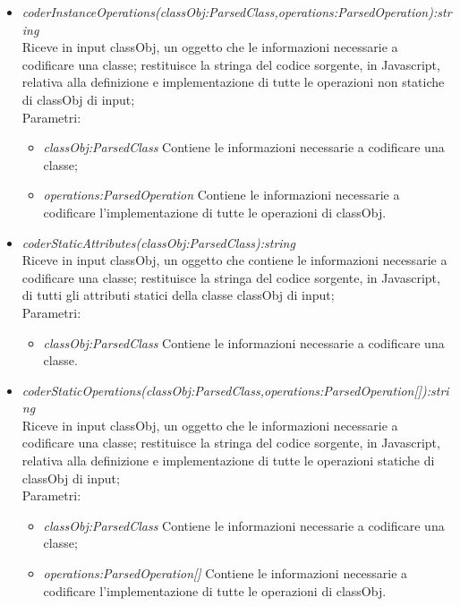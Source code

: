 \documentclass[../DefinizioneDiProdotto.tex]{subfiles}
\begin{document}
\begin{itemize}
\begin{itemize}
					\item \emph{coderInstanceOperations(classObj:ParsedClass,operations:ParsedOperation):string} \\ 
					Riceve in input classObj, un oggetto che le informazioni necessarie a codificare una classe; 
					restituisce la stringa del codice sorgente, in Javascript, relativa alla definizione e implementazione di tutte le operazioni non statiche di classObj di input; \\
					Parametri:
					\begin{itemize}
						\item \emph{classObj:ParsedClass} Contiene le informazioni necessarie a codificare una classe;
						\item \emph{operations:ParsedOperation} Contiene le informazioni necessarie a codificare l'implementazione di tutte le operazioni di classObj.
					\end{itemize}
					
					\item \emph{coderStaticAttributes(classObj:ParsedClass):string} \\ 
					Riceve in input classObj, un oggetto che contiene le informazioni necessarie a codificare una classe; 
					restituisce la stringa del codice sorgente, in Javascript, di tutti gli attributi statici della classe classObj di input; \\
					Parametri:
					\begin{itemize}
						\item \emph{classObj:ParsedClass} Contiene le informazioni necessarie a codificare una classe.
					\end{itemize}
					
					\item \emph{coderStaticOperations(classObj:ParsedClass,operations:ParsedOperation[]):string} \\ 
					Riceve in input classObj, un oggetto che le informazioni necessarie a codificare una classe; 
					restituisce la stringa del codice sorgente, in Javascript, relativa alla definizione e implementazione di tutte le operazioni statiche di classObj di input; \\
					Parametri:
					\begin{itemize}
						\item \emph{classObj:ParsedClass} Contiene le informazioni necessarie a codificare una classe;
						\item \emph{operations:ParsedOperation[]} Contiene le informazioni necessarie a codificare l'implementazione di tutte le operazioni di classObj.
					\end{itemize}
					

\end{itemize}
\end{itemize}
\end{document}
